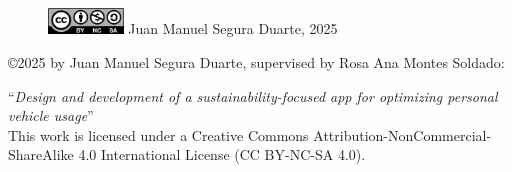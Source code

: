 \thispagestyle{empty}
\vspace*{\fill}

\begin{figure}[H]
    \includegraphics[width=2cm]{images/by-nc-sa.png} Juan Manuel Segura Duarte, 2025
\end{figure}

\copyright 2025 by Juan Manuel Segura Duarte, supervised by Rosa Ana Montes Soldado:

``\textit{Design and development of a sustainability-focused app for optimizing personal vehicle usage}'' \\

This work is licensed under a Creative Commons Attribution-NonCommercial-ShareAlike 4.0 International License (CC BY-NC-SA 4.0).

